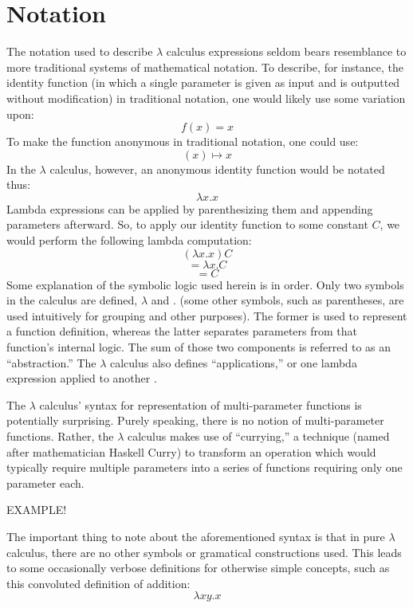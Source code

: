 \documentclass{article}
\begin{document}
\section{Notation}
The notation used to describe $\lambda$ calculus expressions seldom bears resemblance to more traditional systems of mathematical notation. To describe, for instance, the identity function (in which a single parameter is given as input and is outputted without modification) in traditional notation, one would likely use some variation upon:
$$f(x)=x$$
To make the function anonymous in traditional notation, one could use:
$$(x) \mapsto x$$
In the $\lambda$ calculus, however, an anonymous identity function would be notated thus:
$$\lambda x.x$$
Lambda expressions can be applied by parenthesizing them and appending parameters afterward. So, to apply our identity function to some constant $C$, we would perform the following lambda computation:
$$(\lambda x.x)C$$
$$=\lambda x.C$$
$$=C$$
Some explanation of the symbolic logic used herein is in order. Only two symbols in the calculus are defined, $\lambda$ and $.$ (some other symbols, such as parentheses, are used intuitively for grouping and other purposes). The former is used to represent a function definition, whereas the latter separates parameters from that function's internal logic. The sum of those two components is referred to as an ``abstraction.'' The $\lambda$ calculus also defines ``applications,'' or one lambda expression applied to another \cite{horowitz}.

The $\lambda$ calculus' syntax for representation of multi-parameter functions is potentially surprising. Purely speaking, there is no notion of multi-parameter functions. Rather, the $\lambda$ calculus makes use of ``currying,'' a technique (named after mathematician Haskell Curry) to transform an operation which would typically require multiple parameters into a series of functions requiring only one parameter each.

EXAMPLE!

The important thing to note about the aforementioned syntax is that in pure $\lambda$ calculus, there are no other symbols or gramatical constructions used. This leads to some occasionally verbose definitions for otherwise simple concepts, such as this convoluted definition of addition:
$$\lambda xy.x$$


\end{document}
